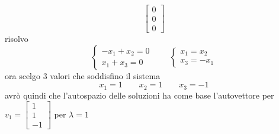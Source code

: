 \documentclass[italian]{article}
\begin{document}
\begin{enumerate}[label=\textbf{\alph*)}]
\begin{itemize}
\[\begin{bmatrix}
						0 \\ 0 \\ 0
					\end{bmatrix}
				\]
				risolvo
				\[
					\begin{cases*}
						-x_1 + x_2 = 0 \\
						x_1 + x_3 = 0
					\end{cases*}
					\qquad
					\begin{cases*}
						x_1 = x_2 \\
						x_3 = -x_1
					\end{cases*}
				\]
				ora scelgo 3 valori che soddisfino il sistema
				\[ 
					x_1 = 1 \qquad x_2 = 1 \qquad x_3 = -1
				\]
				avrò quindi che l'autospazio delle soluzioni ha come base l'autovettore per $v_1 = \begin{bmatrix}1 \\ 1 \\ -1\end{bmatrix}$ per $\lambda = 1$


\end{itemize}
\end{enumerate}
\end{document}
